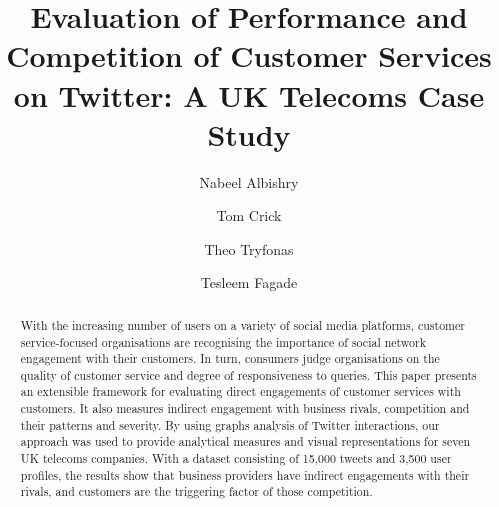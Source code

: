 \documentclass[sigconf]{acmart}
\begin{document}
\title[Evaluation of Performance and Competition of Customer Services on
  Twitter]{Evaluation of Performance and Competition of Customer Services on
  Twitter: A UK Telecoms Case Study}

\author{Nabeel Albishry}

\author{Tom Crick}

\author{Theo Tryfonas}


\author{Tesleem Fagade}



 
\renewcommand{\shortauthors}{Albishry, Crick, Tryfonas, and Fagade}


\begin{abstract}
With the increasing number of users on a variety of social media
platforms, customer service-focused organisations are recognising the
importance of social network engagement with their customers. In turn,
consumers judge organisations on the quality of customer service and
degree of responsiveness to queries. This paper presents an extensible
framework for evaluating direct engagements of customer services with
customers. It also measures indirect engagement with business rivals,
competition and their patterns and severity. By using graphs analysis
of Twitter interactions, our approach was used to provide analytical
measures and visual representations for seven UK telecoms
companies. With a dataset consisting of 15,000 tweets and 3,500 user
profiles, the results show that business providers have indirect
engagements with their rivals, and customers are the triggering factor
of those competition.
\end{abstract}


\maketitle
\end{document}

